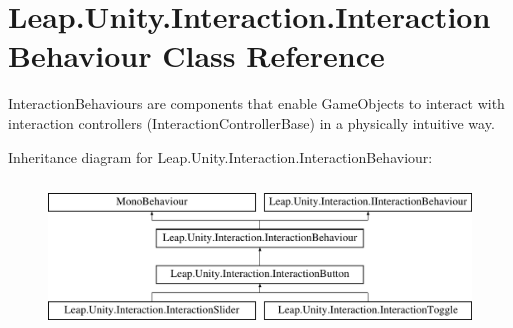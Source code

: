 \hypertarget{class_leap_1_1_unity_1_1_interaction_1_1_interaction_behaviour}{}\section{Leap.\+Unity.\+Interaction.\+Interaction\+Behaviour Class Reference}
\label{class_leap_1_1_unity_1_1_interaction_1_1_interaction_behaviour}


Interaction\+Behaviours are components that enable Game\+Objects to interact with interaction controllers (Interaction\+Controller\+Base) in a physically intuitive way.  


Inheritance diagram for Leap.\+Unity.\+Interaction.\+Interaction\+Behaviour\+:\begin{figure}[H]
\begin{center}
\leavevmode
\includegraphics[height=4.000000cm]{class_leap_1_1_unity_1_1_interaction_1_1_interaction_behaviour}
\end{center}
\end{figure}

